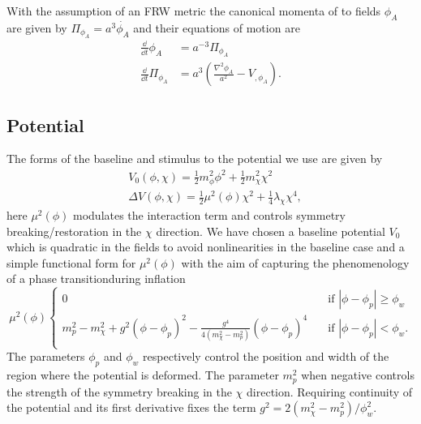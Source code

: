 With the assumption of an FRW metric the canonical momenta of to fields $\phi_A$ are given by $\Pi_{\phi_A} = a^3\dot{\phi_A}$ and their equations of motion are
\begin{align} \label{eq:fld eom}
  \frac{\dd}{\dd t} \phi_A &= a^{-3}\Pi_{\phi_A} \\
  \frac{\dd}{\dd t} \Pi_{\phi_A} &= a^3\left(\frac{\nabla^2\phi_A}{a^2} - V_{,\phi_A}\right).
\end{align} 

\subsection{Potential}
\Fpotential




The forms of the baseline and stimulus to the potential we use are given by
\begin{align} \label{eq:potential}
  &V_0(\phi,\chi) = \frac{1}{2}m^2_\phi\phi^2 + \frac{1}{2}m^2_\chi\chi^2 \\
  &\Delta V(\phi,\chi) = \frac{1}{2}\mu^2(\phi)\chi^2 + \frac{1}{4}\lambda_\chi\chi^4,
\end{align} 
here $\mu^2(\phi)$ modulates the interaction term and controls symmetry breaking/restoration in the $\chi$ direction.
We have chosen a baseline potential $V_0$ which is quadratic in the fields to avoid nonlinearities in the baseline case and a simple functional form for $\mu^2(\phi)$ with the aim of capturing the phenomenology of a phase transitionduring inflation
\begin{equation} \label{eq:m2 eff}
  \mu^2(\phi)
  \begin{cases}
    0 & \quad \text{if } |\phi-\phi_p|\ge\phi_w \\
    m^2_p - m^2_\chi + g^2(\phi-\phi_p)^2 -\frac{g^4}{4(m^2_\chi-m^2_p)}(\phi-\phi_p)^4 & \quad \text{if } |\phi-\phi_p|<\phi_w. \\
  \end{cases}
\end{equation} 
The parameters $\phi_p$ and $\phi_w$ respectively control the position and width of the region where the potential is deformed.
The parameter $m^2_p$ when negative controls the strength of the symmetry breaking in the $\chi$ direction.
Requiring continuity of the potential and its first derivative fixes the term $g^2=2(m^2_\chi-m^2_p)/\phi_w^2$.

